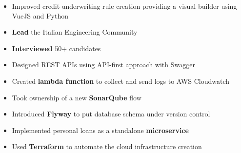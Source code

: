 \documentclass[10pt,a4paper,ragged2e]{altacv}
\begin{document}

\begin{fullwidth}
\makecvheader
\end{fullwidth}



\begin{itemize}
\item Improved credit underwriting rule creation providing a visual builder using VueJS and Python
\item \textbf{Lead} the Italian Engineering Community
\item \textbf{Interviewed} 50+ candidates
\end{itemize}

\divider

\begin{itemize}
\item Designed REST APIs using API-first approach with Swagger
\item Created \textbf{lambda function} to collect and send logs to AWS Cloudwatch
\item Took ownership of a new \textbf{SonarQube} flow
\end{itemize}

\divider

\begin{itemize}
\item Introduced \textbf{Flyway} to put database schema under version control
\item Implemented personal loans as a standalone \textbf{microservice}
\item Used \textbf{Terraform} to automate the cloud infrastructure creation
\end{itemize}
\divider
\end{document}

